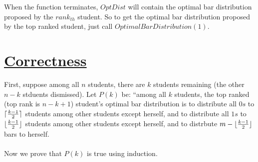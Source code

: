\documentclass[11pt]{article}
\DeclarePairedDelimiter\ceil{\lceil}{\rceil}
\DeclarePairedDelimiter\floor{\lfloor}{\rfloor}
\begin{document}
When the function terminates, $OptDist$ will contain the optimal bar
distribution proposed by the $rank_{th}$ student. So to get the
optimal bar distribution proposed by the top ranked student, just call
$OptimalBarDistribution(1)$.

\section*{\underline{Correctness}}
First, suppose among all $n$ students, there are $k$ students
remaining (the other $n-k$ stduents dismissed). Let $P(k)$ be: ``among
all $k$ students, the top ranked (top rank is $n-k+1$) student's
optimal bar distribution is 
to distribute all $0s$ to $\ceil{\frac{k-1}{2}}$ students among other
students except herself, and to
distribute all $1s$ to $\floor{\frac{k-1}{2}}$ students among other
students except herself, and to distrbute $m-\floor{\frac{k-1}{2}}$ bars
to herself.\\\\
Now we prove that $P(k)$ is true using induction.
\end{document}
